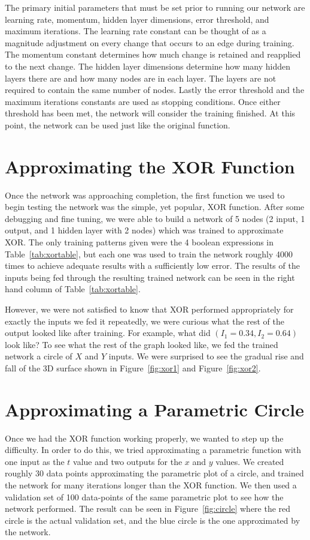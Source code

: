 \documentclass{article}
\begin{document}
\begin{multicols}{2}
The primary initial parameters that must be set prior to running our network are learning rate, momentum, hidden layer dimensions, error threshold, and maximum iterations. The learning rate constant can be thought of as a magnitude adjustment on every change that occurs to an edge during training. The momentum constant determines how much change is retained and reapplied to the next change. The hidden layer dimensions determine how many hidden layers there are and how many nodes are in each layer. The layers are not required to contain the same number of nodes. Lastly the error threshold and the maximum iterations constants are used as stopping conditions. Once either threshold has been met, the network will consider the training finished. At this point, the network can be used just like the original function.

\section{Approximating the XOR Function}

Once the network was approaching completion, the first function we used to begin testing the network was the simple, yet popular, XOR function. After some debugging and fine tuning, we were able to build a network of 5 nodes (2 input, 1 output, and 1 hidden layer with 2 nodes) which was trained to approximate XOR. The only training patterns given were the 4 boolean expressions in Table~\ref{tab:xortable}, but each one was used to train the network roughly 4000 times to achieve adequate results with a sufficiently low error. The results of the inputs being fed through the resulting trained network can be seen in the right hand column of Table~\ref{tab:xortable}.

However, we were not satisfied to know that XOR performed appropriately for exactly the inputs we fed it repeatedly, we were curious what the rest of the output looked like after training. For example, what did $(I_1=0.34, I_2=0.64)$ look like? To see what the rest of the graph looked like, we fed the trained network a circle of $X$ and $Y$ inputs. We were surprised to see the gradual rise and fall of the 3D surface shown in Figure~\ref{fig:xor1} and Figure~\ref{fig:xor2}.

\section{Approximating a Parametric Circle}

Once we had the XOR function working properly, we wanted to step up the difficulty. In order to do this, we tried approximating a parametric function with one input as the $t$ value and two outputs for the $x$ and $y$ values. We created roughly 30 data points approximating the parametric plot of a circle, and trained the network for many iterations longer than the XOR function. We then used a validation set of 100 data-points of the same parametric plot to see how the network performed. The result can be seen in Figure~\ref{fig:circle} where the red circle is the actual validation set, and the blue circle is the one approximated by the network.


\end{multicols}
\end{document}

